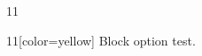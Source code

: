 \documentclass[paper=A4]{ropas-poster}
\begin{document}
\begin{postergrid}{1}{1}
\begin{posterblock}{1}{1}[color=yellow]
Block option test.
\end{posterblock}
\end{postergrid}
\end{document}
